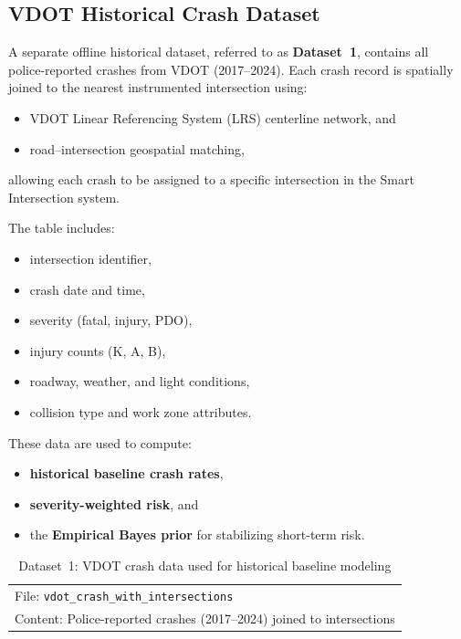 \documentclass[conference]{IEEEtran}
\begin{document}
\subsection{VDOT Historical Crash Dataset}
A separate offline historical dataset, referred to as \textbf{Dataset~1}, contains
all police-reported crashes from VDOT (2017--2024). Each crash record is spatially
joined to the nearest instrumented intersection using:
\begin{itemize}
    \item VDOT Linear Referencing System (LRS) centerline network, and
    \item road–intersection geospatial matching,
\end{itemize}
allowing each crash to be assigned to a specific intersection in the Smart 
Intersection system.

The table includes:
\begin{itemize}
    \item intersection identifier,
    \item crash date and time,
    \item severity (fatal, injury, PDO),
    \item injury counts (K, A, B),
    \item roadway, weather, and light conditions,
    \item collision type and work zone attributes.
\end{itemize}

These data are used to compute:
\begin{itemize}
    \item \textbf{historical baseline crash rates},
    \item \textbf{severity-weighted risk}, and
    \item the \textbf{Empirical Bayes prior} for stabilizing short-term risk.
\end{itemize}

\begin{table}[h]
\centering
\caption{Dataset~1: VDOT crash data used for historical baseline modeling}
\label{dataset:vdot}
\begin{tabular}{l}
\toprule
File: \texttt{vdot\_crash\_with\_intersections} \\
Content: Police-reported crashes (2017--2024) joined to intersections \\
\bottomrule
\end{tabular}
\end{table}
\end{document}
